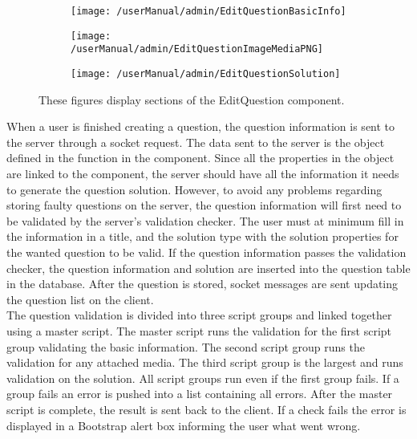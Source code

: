 \begin{figure}[H]
	\centering
	\begin{subfigure}{0.45\linewidth}
        \texttt{[image: /userManual/admin/EditQuestionBasicInfo]}
        \label{fig:editQuestionBasic}
	\end{subfigure}
	\hfill
	\begin{subfigure}{0.45\linewidth}
		\texttt{[image: /userManual/admin/EditQuestionImageMediaPNG]}	
		\label{fig:editQuestionMedia}
	\end{subfigure}
	\begin{subfigure}{0.45\linewidth}
		\texttt{[image: /userManual/admin/EditQuestionSolution]}
		\label{fig:editQuestionSolution}
	\end{subfigure}
	\caption{These figures display sections of the EditQuestion component.}
	\label{fig:editQuestion}
\end{figure}
\noindent
When a user is finished creating a question, the question information is sent to the server through a socket request. The data sent to the server is the  object defined in the function  in the component. Since all the properties in the  object are linked to the component, the server should have all the information it needs to generate the question solution. However, to avoid any problems regarding storing faulty questions on the server, the question information will first need to be validated by the server's validation checker. The user must at minimum fill in the information in a title, and the solution type with the solution properties for the wanted question to be valid. If the question information passes the validation checker, the question information and solution are inserted into the question table in the database. After the question is stored, socket messages are sent updating the question list on the client.
\\[11pt]
The question validation is divided into three script groups and linked together using a master script. The master script runs the validation for the first script group validating the basic information. The second script group runs the validation for any attached media. The third script group is the largest and runs validation on the solution. All script groups run even if the first group fails. If a group fails an error is pushed into a list containing all errors. After the master script is complete, the result is sent back to the client. If a check fails the error is displayed in a Bootstrap alert box informing the user what went wrong.
